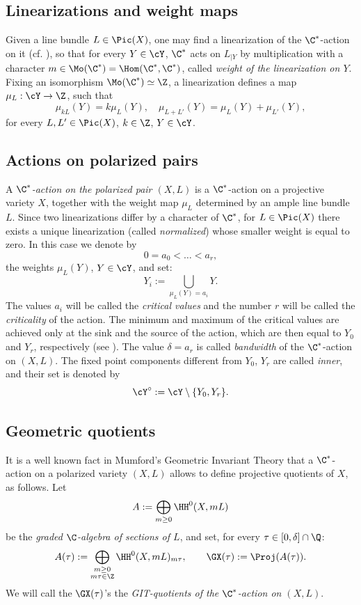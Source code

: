 \documentclass[reqno]{amsproc}
\theoremstyle{definition}
\begin{document}

\subsection{Linearizations and weight maps}\label{sssec:lin} Given  a line bundle $L\in \Pic(X)$, one may find a linearization of the $\C^*$-action on it (cf. \cite{KKLV}), so that for every $Y\in \cY$, $\C^*$ acts on $L_{|Y}$ by multiplication with a character $m\in \Mo(\C^*)=\Hom(\C^*,\C^*)$, called {\em weight of the linearization on $Y$}. Fixing an isomorphism $\Mo(\C^*)\simeq \Z$, a linearization defines a map $\mu_L:\cY\to\Z$, such that 
$$
\mu_{kL}(Y)=k\mu_L(Y),\quad \mu_{L+L'}(Y)=\mu_{L}(Y)+\mu_{L'}(Y),
$$
for every $L,L'\in\Pic(X)$, $k\in \Z$, $Y\in \cY$.


\subsection{Actions on polarized pairs}\label{sssec:polar} A {\em $\C^*$-action on the polarized pair $(X,L)$}
is a $\C^*$-action on a projective variety $X$, together with the weight map $\mu_L$ determined by an ample line bundle $L$.  Since two linearizations differ by a character of $\C^*$, for $L \in \Pic(X)$ there exists a unique linearization (called {\em normalized})  whose smaller weight is equal to zero.
In this case we denote by 
$$
0=a_0<\dots<a_r,$$ 
the weights $\mu_L(Y)$, $Y\in\cY$,  
and set: 
$$
Y_i:=\bigcup_{\mu_L(Y)=a_i}Y.
$$ 
The values $a_i$ will be called the {\em critical values} and the number $r$ will be called the {\em criticality} of the action.
The minimum and maximum of the critical values are achieved only at the  sink and the  source of the action, which are then equal to $Y_0$ and $Y_r$, respectively (see \cite[Remark 2.12]{WORS1}). The value $\delta=a_r$ is called {\em bandwidth} of the $\C^*$-action on $(X,L)$. The fixed point components different from $Y_0$, $Y_r$ are called {\em inner}, and their set is denoted by $$\cY^\circ :=\cY\setminus\{Y_0,Y_r\}.$$


\subsection{Geometric quotients}\label{sssec:quotients} It is a well known fact in Mumford's Geometric Invariant Theory that a $\C^*$-action on a polarized variety $(X,L)$  allows to define projective quotients of $X$, as follows. Let 
\[A:=\bigoplus_{m\geq 0}\HH^0(X,mL)\] 
be the {\em graded $\C$-algebra of sections of $L$}, and set, for every $\tau \in [0,\delta]\cap \Q$:
 \[A(\tau):=\bigoplus_{\substack{m\geq 0\\m\tau\in\Z}}\HH^0(X,mL)_{m\tau},\qquad \GX(\tau):=\Proj(A(\tau)).
\]
We will call the  $\GX(\tau)$'s the {\em GIT-quotients of the $\C^*$-action on $(X,L)$}.
\end{document}
